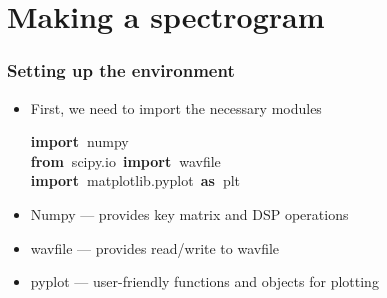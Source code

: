 \documentclass{beamer}\usepackage[]{graphicx}\usepackage[]{color}
\makeatletter
\newcommand{\hlopt}[1]{\textcolor[rgb]{0,0,0}{#1}}%
\newcommand{\hlstd}[1]{\textcolor[rgb]{0.345,0.345,0.345}{#1}}%
\newcommand{\hlkwa}[1]{\textcolor[rgb]{0.161,0.373,0.58}{\textbf{#1}}}%
\newenvironment{kframe}{%
 \def\at@end@of@kframe{}%
 \ifinner\ifhmode%
  \def\at@end@of@kframe{\end{minipage}}%
  \begin{minipage}{\columnwidth}%
 \fi\fi%
 \def\FrameCommand##1{\hskip\@totalleftmargin \hskip-\fboxsep
 \colorbox{shadecolor}{##1}\hskip-\fboxsep
     \hskip-\linewidth \hskip-\@totalleftmargin \hskip\columnwidth}%
 \MakeFramed {\advance\hsize-\width
   \@totalleftmargin\z@ \linewidth\hsize
   \@setminipage}}%
 {\par\unskip\endMakeFramed%
 \at@end@of@kframe}
\newenvironment{knitrout}{}{} %
\makeatother
\begin{document}
\section{Making a spectrogram}
\begin{frame}[fragile]
\frametitle{Setting up the environment}
\begin{itemize}
	\item First, we need to import the necessary modules
\begin{knitrout}
\color{fgcolor}\begin{kframe}
\noindent
\ttfamily
\hlstd{}\hlkwa{import\ }\hlstd{numpy}\hspace*{\fill}\\
\hlkwa{from\ }\hlstd{scipy}\hlopt{.}\hlstd{io\ }\hlkwa{import\ }\hlstd{wavfile}\hspace*{\fill}\\
\hlkwa{import\ }\hlstd{matplotlib}\hlopt{.}\hlstd{pyplot\ }\hlkwa{as\ }\hlstd{plt}\hspace*{\fill}
\mbox{}
\normalfont
\end{kframe}
\end{knitrout}
\end{itemize}

\begin{itemize}
	\item Numpy --- provides key matrix and DSP operations

	\item wavfile --- provides read/write to wavfile
	
	\item pyplot --- user-friendly functions and objects for plotting
\end{itemize}
\end{frame}
\end{document}
